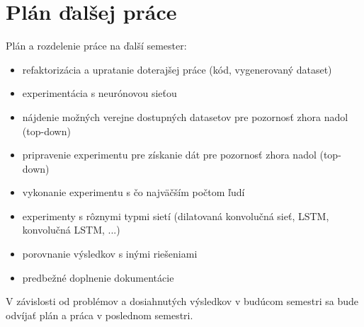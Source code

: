 \newpage
\pagestyle{plain}

\section{Plán ďalšej práce}

Plán a rozdelenie práce na ďalší semester:

\begin{itemize}
	\item refaktorizácia a upratanie doterajšej práce (kód, vygenerovaný dataset)
	\item experimentácia s neurónovou sieťou
	\item nájdenie možných verejne dostupných datasetov pre pozornosť zhora nadol (top-down)
	\item pripravenie experimentu pre získanie dát pre pozornosť zhora nadol (top-down)
	\item vykonanie experimentu s čo najväčším počtom ľudí
	\item experimenty s rôznymi typmi sietí (dilatovaná konvolučná sieť, LSTM, konvolučná LSTM, ...)
	\item porovnanie výsledkov s inými riešeniami
	\item predbežné doplnenie dokumentácie
\end{itemize}

V závislosti od problémov a dosiahnutých výsledkov v budúcom semestri sa bude odvíjať plán a práca v poslednom semestri.